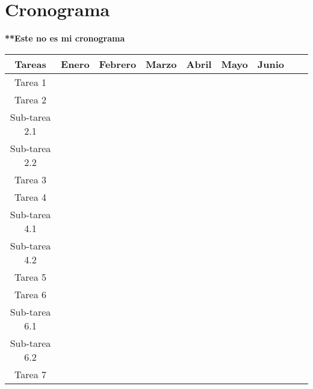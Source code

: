 \documentclass[11pt, spanish, letterpage]{article}
\begin{document}
\section{Cronograma}

\textbf{**Este no es mi cronograma}

\begin{center}
        \begin{tabular}{|c|c|c|c|c|c|c|c|c|}
                \hline
                \textbf{Tareas} & \textbf{Enero} & \textbf{Febrero} & \textbf{Marzo} & \textbf{Abril} & \textbf{Mayo} & \textbf{Junio} \\ \hline
                Tarea 1 & \cellcolor[gray]{0.5} &  &  &  &  &	\\ \hline
                Tarea 2 &  & \cellcolor[gray]{0.5} & & & &	\\ \hline
                Sub-tarea 2.1 & & \cellcolor[gray]{0.5} & & & &	\\ \hline
                Sub-tarea 2.2 & & \cellcolor[gray]{0.5} & & & &	\\ \hline
                Tarea 3 & & & \cellcolor[gray]{0.5} & & &	\\ \hline
                Tarea 4 & & & & \cellcolor[gray]{0.5} & \cellcolor[gray]{0.5} &	\\ \hline
                Sub-tarea 4.1 & & & & \cellcolor[gray]{0.5} & \cellcolor[gray]{0.5} &	\\ \hline
                Sub-tarea 4.2 & & & & \cellcolor[gray]{0.5} & \cellcolor[gray]{0.5} &	\\ \hline
                Tarea 5 & & & & & \cellcolor[gray]{0.5} & \cellcolor[gray]{0.5}	\\ \hline
                Tarea 6 & & & & & & \cellcolor[gray]{0.5}	\\ \hline
                Sub-tarea 6.1 & & & & & & \cellcolor[gray]{0.5}	\\ \hline
                Sub-tarea 6.2 & & & & & & \cellcolor[gray]{0.5}	\\ \hline
                Tarea 7 & & & & & &	\\ \hline

        \end{tabular}
\end{center}



\end{document}
